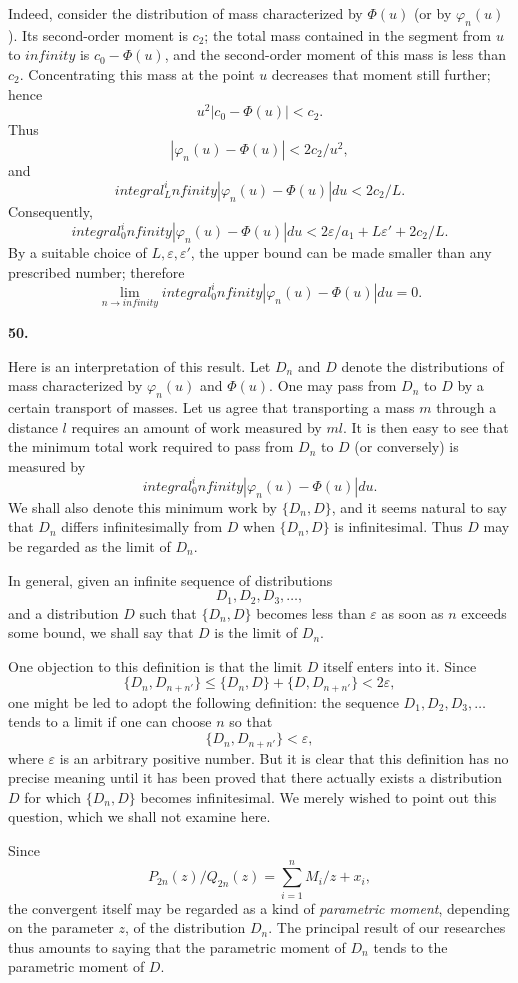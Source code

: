 \documentclass[
  paper=b5,
  fontsize=13pt,
  twoside,
  headings=normal,
  bookmarkpackage=false
]{scrartcl}
\theoremstyle{stieltjesplain}
\theoremstyle{stieltjesdefinition}
\def\int{integral}%
\def\frac#1#2{#1/#2}%
\def\infty{infinity}%
\def\,{ }%
\newcommand{\origsection}[1]{%
  \par\addvspace{0.85\baselineskip}%
  \phantomsection\label{sec:#1}%
  \addcontentsline{toc}{subsection}{\texorpdfstring{\S~#1}{Section #1}}%
  \noindent\textbf{#1.}\quad\ignorespaces
}
\begin{document}
Indeed, consider the distribution of mass characterized by $\Phi(u)$ (or by $\varphi_n(u)$). Its second-order moment is $c_2$; the total mass contained in the segment from $u$ to $\infty$ is $c_0-\Phi(u)$, and the second-order moment of this mass is less than $c_2$. Concentrating this mass at the point $u$ decreases that moment still further; hence
\[
 u^2|c_0-\Phi(u)|<c_2.
\]
Thus
\[
 |\varphi_n(u)-\Phi(u)|<\frac{2c_2}{u^2},
\]
and
\[
 \int_L^\infty|\varphi_n(u)-\Phi(u)|\,du<\frac{2c_2}{L}.
\]
Consequently,
\[
 \int_0^\infty|\varphi_n(u)-\Phi(u)|\,du
 <\frac{2\varepsilon}{a_1}+L\varepsilon'+\frac{2c_2}{L}.
\]
By a suitable choice of $L,\varepsilon,\varepsilon'$, the upper bound can be made smaller than any prescribed number; therefore
\[
 \lim_{n\to\infty}\int_0^\infty|\varphi_n(u)-\Phi(u)|\,du=0.
\]

\origsection{50}
Here is an interpretation of this result. Let $D_n$ and $D$ denote the distributions of mass characterized by $\varphi_n(u)$ and $\Phi(u)$. One may pass from $D_n$ to $D$ by a certain transport of masses. Let us agree that transporting a mass $m$ through a distance $l$ requires an amount of work measured by $ml$. It is then easy to see that the minimum total work required to pass from $D_n$ to $D$ (or conversely) is measured by
\[
 \int_0^\infty|\varphi_n(u)-\Phi(u)|\,du.
\]
We shall also denote this minimum work by $\{D_n,D\}$, and it seems natural to say that $D_n$ differs infinitesimally from $D$ when $\{D_n,D\}$ is infinitesimal. Thus $D$ may be regarded as the limit of $D_n$.

In general, given an infinite sequence of distributions
\[
 D_1,D_2,D_3,\ldots,
\]
and a distribution $D$ such that $\{D_n,D\}$
becomes less than $\varepsilon$ as soon as $n$ exceeds some bound, we shall say that $D$ is the limit of $D_n$.

One objection to this definition is that the limit $D$ itself enters into it. Since
\[
 \{D_n,D_{n+n'}\}\leq\{D_n,D\}+\{D,D_{n+n'}\}<2\varepsilon,
\]
one might be led to adopt the following definition: the sequence $D_1,D_2,D_3,\ldots$ tends to a limit if one can choose $n$ so that
\[
 \{D_n,D_{n+n'}\}<\varepsilon,
\]
where $\varepsilon$ is an arbitrary positive number. But it is clear that this definition has no precise meaning until it has been proved that there actually exists a distribution $D$ for which $\{D_n,D\}$ becomes infinitesimal. We merely wished to point out this question, which we shall not examine here.

Since
\[
 \frac{P_{2n}(z)}{Q_{2n}(z)}
 =\sum_{i=1}^n\frac{M_i}{z+x_i},
\]
the convergent itself may be regarded as a kind of \emph{parametric moment}, depending on the parameter $z$, of the distribution $D_n$. The principal result of our researches thus amounts to saying that the parametric moment of $D_n$ tends to the parametric moment of $D$.
\end{document}
